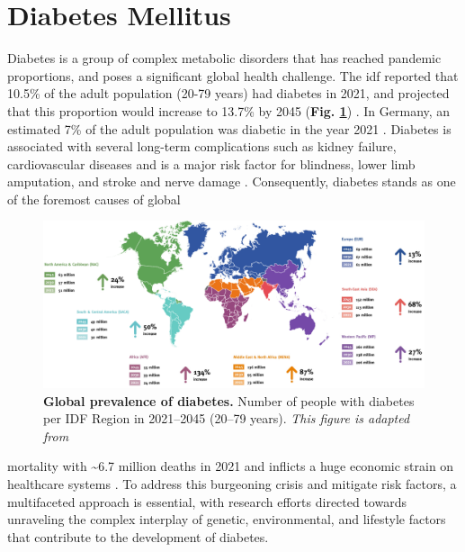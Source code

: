 \section{Diabetes Mellitus}  %
\label{sec:diabetes}
Diabetes is a group of complex metabolic disorders that has reached pandemic proportions, and poses a significant global health challenge. %
The \gls{idf} reported that 10.5\% of the adult population (20-79 years) had diabetes in 2021, and projected that this proportion would increase to 13.7\% by 2045 (\textbf{Fig. \ref{fig:chp1_idf}}) \textbf{\cite{home_idf_nodate}}. In Germany, an estimated 7\% of the adult population was diabetic in the year 2021 \textbf{\cite{noauthor_germany_nodate}}. Diabetes is associated with several long-term complications such as kidney failure, cardiovascular diseases and is a major risk factor for blindness, lower limb amputation,%
 and stroke and nerve damage \textbf{\cite{ashcroft_diabetes_2012,the_emerging_risk_factors_collaboration_diabetes_2010,leon_diabetes_2015}}. Consequently, diabetes stands as one of the foremost causes of global 

\begin{figure}[H]
\centering
\includegraphics[width=15cm]{Chapter1/Fig/F1-3-01.png}
\caption[Global prevalence of diabetes]{\textbf{Global prevalence of diabetes.} Number of people with diabetes per IDF Region in 2021–2045 (20–79 years). \textit{This figure is adapted from \textbf{\cite{home_idf_nodate}}}}
\label{fig:chp1_idf}
\end{figure}
 mortality with \textasciitilde6.7 million deaths in 2021 and inflicts a huge economic strain on healthcare systems  \textbf{\cite{home_idf_nodate}}. %
To address this burgeoning crisis and mitigate risk factors, a multifaceted approach is essential, with research efforts directed towards unraveling the complex interplay of genetic, environmental, and lifestyle factors that contribute to the development of diabetes.\\

